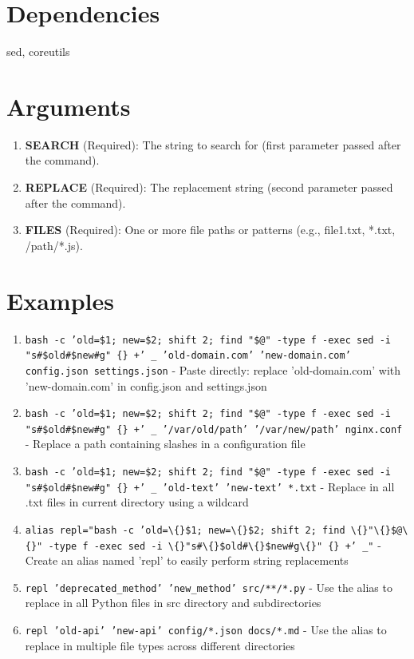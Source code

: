 \documentclass{article}
\begin{document}
\section*{Dependencies}
sed, coreutils


\section*{Arguments}
\begin{enumerate}
  \item \textbf{SEARCH} (Required): The string to search for (first parameter passed after the command).
  \item \textbf{REPLACE} (Required): The replacement string (second parameter passed after the command).
  \item \textbf{FILES} (Required): One or more file paths or patterns (e.g., file1.txt, *.txt, /path/*.js).
\end{enumerate}

\section*{Examples}
\begin{enumerate}
  \item \texttt{bash -c 'old=\$1; new=\$2; shift 2; find "\$@" -type f -exec sed -i "s\#\$old\#\$new\#g" \{\} +' \_ 'old-domain.com' 'new-domain.com' config.json settings.json} - Paste directly: replace 'old-domain.com' with 'new-domain.com' in config.json and settings.json
  \item \texttt{bash -c 'old=\$1; new=\$2; shift 2; find "\$@" -type f -exec sed -i "s\#\$old\#\$new\#g" \{\} +' \_ '/var/old/path' '/var/new/path' nginx.conf} - Replace a path containing slashes in a configuration file
  \item \texttt{bash -c 'old=\$1; new=\$2; shift 2; find "\$@" -type f -exec sed -i "s\#\$old\#\$new\#g" \{\} +' \_ 'old-text' 'new-text' *.txt} - Replace in all .txt files in current directory using a wildcard
  \item \texttt{alias repl="bash -c 'old=\textbackslash\{\}\$1; new=\textbackslash\{\}\$2; shift 2; find \textbackslash\{\}"\textbackslash\{\}\$@\textbackslash\{\}" -type f -exec sed -i \textbackslash\{\}"s\#\textbackslash\{\}\$old\#\textbackslash\{\}\$new\#g\textbackslash\{\}" \{\} +' \_"} - Create an alias named 'repl' to easily perform string replacements
  \item \texttt{repl 'deprecated\_method' 'new\_method' src/**/*.py} - Use the alias to replace in all Python files in src directory and subdirectories
  \item \texttt{repl 'old-api' 'new-api' config/*.json docs/*.md} - Use the alias to replace in multiple file types across different directories
\end{enumerate}
\end{document}
